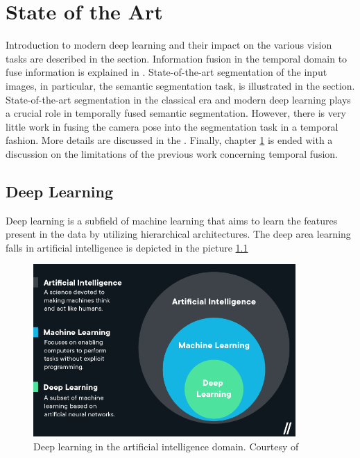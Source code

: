 

    \chapter{State of the Art}
	\label{chap:stateofart}
	
	Introduction to modern deep learning and their impact on the various vision tasks are described in the  section. Information fusion in the temporal domain to fuse information is explained in . State-of-the-art segmentation of the input images, in particular, the semantic segmentation task, is illustrated in the  section. State-of-the-art segmentation in the classical era and modern deep learning plays a crucial role in temporally fused semantic segmentation. However, there is very little work in fusing the camera pose into the segmentation task in a temporal fashion. More details are discussed in the . Finally, chapter \ref{chap:stateofart} is ended with a discussion on the limitations of the previous work concerning temporal fusion. 
	
    \section{Deep Learning}
    \label{sec:deeplearn}
    
	Deep learning is a subfield of machine learning that aims to learn the features present in the data by utilizing hierarchical architectures. The deep area learning falls in artificial intelligence is depicted in the picture \ref{fig:DLAI}
    
    \begin{figure}[h]
    	\centering
    	\includegraphics[width=10cm]{images/mldl.png}
    	\caption{Deep learning in the artificial intelligence domain. Courtesy of \cite{35_mldl}}
    	\label{fig:DLAI}
    \end{figure}  
    
